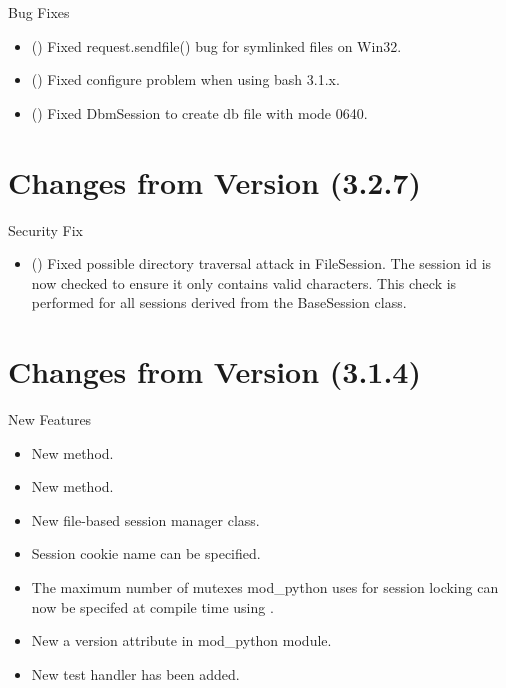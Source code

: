   Bug Fixes

  \begin{itemize}
    \item
      ()
      Fixed request.sendfile() bug for symlinked files on Win32.
    \item
      ()
      Fixed configure problem when using bash 3.1.x.
    \item
      ()
      Fixed DbmSession to create db file with mode 0640.
  \end{itemize}
 
\chapter{Changes from Version (3.2.7)\label{app-changes-from-3.2.7}}


  Security Fix 

  \begin{itemize}
    \item
    ()
    Fixed possible directory traversal attack in FileSession. The session
    id is now checked to ensure it only contains valid characters. This
    check is performed for all sessions derived from the BaseSession 
    class. 
  \end{itemize}

\chapter{Changes from Version (3.1.4)\label{app-changes-from-3.1.4}}

  
  New Features

  \begin{itemize}
    \item
      New  method.
    \item
      New  method.
    \item
      New file-based session manager class.
    \item
      Session cookie name can be specified.
    \item
      The maximum number of mutexes mod_python uses for session locking
      can now be specifed at compile time using 
      .
    \item
      New a version attribute in mod_python module.
    \item
      New test handler  has been added.
  \end{itemize}

